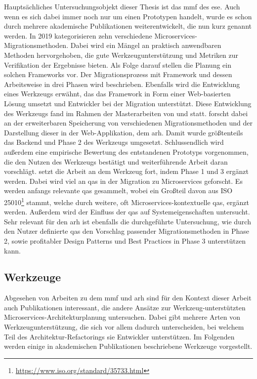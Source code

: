 Hauptsächliches Untersuchungsobjekt dieser Thesis ist das \gls{mmf} des \gls{ese}.
Auch wenn es sich dabei immer noch nur um einen Prototypen handelt, wurde es schon durch mehrere akademische Publikationen weiterentwickelt, die nun kurz genannt werden.
In 2019 kategorisieren  zehn verschiedene Microservices-Migrationsmethoden.
Dabei wird ein Mängel an praktisch anwendbaren Methoden hervorgehoben, die gute Werkzeugunterstützung und Metriken zur Verifikation der Ergebnisse bieten.
Als Folge darauf stellen  die Planung ein solchen Frameworks vor.
Der Migrationsprozess mit Framework und dessen Arbeitsweise in drei Phasen wird beschrieben.
Ebenfalls wird die Entwicklung eines Werkzeugs erwähnt, das das Framework in Form einer Web-basierten Lösung umsetzt und Entwickler bei der Migration unterstützt.
Diese Entwicklung des Werkzeugs fand im Rahmen der Masterarbeiten von  und  statt.
 forscht dabei an der erweiterbaren Speicherung von verschiedenen Migrationsmethoden und der Darstellung dieser in der Web-Applikation, dem \gls{arh}.
Damit wurde größtenteils das Backend und Phase 2 des Werkzeugs umgesetzt.
Schlussendlich wird außerdem eine empirische Bewertung des entstandenen Prototyps vorgenommen, die den Nutzen des Werkzeugs bestätigt und weiterführende Arbeit daran vorschlägt.
 setzt die Arbeit an dem Werkzeug fort, indem Phase 1 und 3 ergänzt werden.
Dabei wird viel an \glspl{qa} in der Migration zu Microservices geforscht.
Es werden anfangs relevante \glspl{qa} gesammelt, wobei ein Großteil davon aus ISO 25010\footnote{\url{https://www.iso.org/standard/35733.html}} stammt, welche durch weitere, oft Microservices-kontextuelle \glspl{qa}, ergänzt werden.
Außerdem wird der Einfluss der \glspl{qa} auf Systemeigenschaften untersucht.
Sehr relevant für den \gls{arh} ist ebenfalls die durchgeführte Untersuchung, wie durch den Nutzer definierte \glspl{qa} den Vorschlag passender Migrationsmethoden in Phase 2, sowie profitabler Design Patterns und Best Practices in Phase 3 unterstützen kann.

\subsection{Werkzeuge}

Abgesehen von Arbeiten zu dem \gls{mmf} und \gls{arh} sind für den Kontext dieser Arbeit auch Publikationen interessant, die andere Ansätze zur Werkzeug-unterstützten Microservices-Architekturplanung untersuchen.
Dabei gibt mehrere Arten von Werkzeugunterstützung, die sich vor allem dadurch unterscheiden, bei welchem Teil des Architektur-Refactorings sie Entwickler unterstützen.
Im Folgenden werden einige in akademischen Publikationen beschriebene Werkzeuge vorgestellt.

